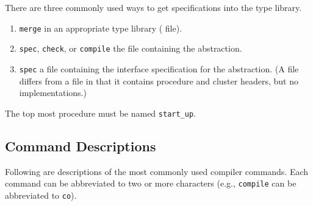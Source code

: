 There are three commonly used ways to get specifications into the type library.

\begin{enumerate}
\item 
{\tt merge} in an appropriate type library ( file).
\item 
{\tt spec}, {\tt check}, or {\tt compile} the  file containing the
abstraction.
\item
{\tt spec} a  file containing the interface specification for the 
abstraction.  (A  file differs from a  file in that it
contains procedure and cluster headers, but no implementations.)
\end{enumerate}

The top most procedure must be named {\tt start\_up}.

\subsection{Command Descriptions}

Following are descriptions of the most commonly used compiler commands.  Each
command can be abbreviated to two or more characters (e.g., {\tt compile} can
be abbreviated to {\tt co}).

